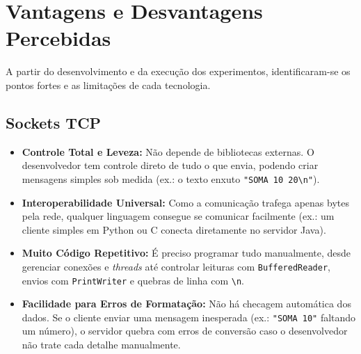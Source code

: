 \documentclass[12pt, a4paper]{article}
\begin{document}
\section{Vantagens e Desvantagens Percebidas}

A partir do desenvolvimento e da execução dos experimentos, identificaram-se os pontos fortes e as limitações de cada tecnologia.

\subsection{Sockets TCP}
\begin{itemize}[label=\textcolor{green!60!black}{\textbf{+}}]
    \item \textbf{Controle Total e Leveza:} Não depende de bibliotecas externas. O desenvolvedor tem controle direto de tudo o que envia, podendo criar mensagens simples sob medida (ex.: o texto enxuto \texttt{"SOMA 10 20\textbackslash n"}).
    \item \textbf{Interoperabilidade Universal:} Como a comunicação trafega apenas bytes pela rede, qualquer linguagem consegue se comunicar facilmente (ex.: um cliente simples em Python ou C conecta diretamente no servidor Java).
\end{itemize}
\begin{itemize}[label=\textcolor{red!80!black}{\textbf{--}}]
    \item \textbf{Muito Código Repetitivo:} É preciso programar tudo manualmente, desde gerenciar conexões e \textit{threads} até controlar leituras com \texttt{BufferedReader}, envios com \texttt{PrintWriter} e quebras de linha com \texttt{\textbackslash n}.
    \item \textbf{Facilidade para Erros de Formatação:} Não há checagem automática dos dados. Se o cliente enviar uma mensagem inesperada (ex.: \texttt{"SOMA 10"} faltando um número), o servidor quebra com erros de conversão caso o desenvolvedor não trate cada detalhe manualmente.
\end{itemize}
\end{document}
